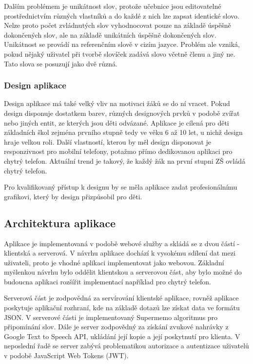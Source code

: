 \documentclass[a4paper,11pt,titlepage,fleqn]{article}
\begin{document}
            Dalším problémem je unikátnost slov, protože učebnice jsou editovatelné prostřednictvím různých vlastníků a do každé z nich lze zapsat identické slovo. Nelze proto počet zvládnutých slov vyhodnocovat pouze na základě úspěšně dokončených slov, ale na základě unikátních úspěšně dokončených slov. Unikátnost se provádí na referenčním slově v cizím jazyce. Problém ale vzniká, pokud nějaký uživatel při tvorbě slovíček zadává slovo včetně členu a jiný ne. Tato slova se posuzují jako dvě různá.

        \subsubsection{Design aplikace}
            Design aplikace má také velký vliv na motivaci žáků se do ní vracet. Pokud design disponuje dostatkem barev, různých designových prvků v podobě zvířat nebo jiných entit, ze kterých jsou děti odvázané. Aplikace je cílená pro děti základních škol zejména prvního stupně tedy ve věku 6 až 10 let, u nichž design hraje velkou roli. Další vlastností, kterou by měl design disponovat je responzivnost pro mobilní telefony, potažmo přímo dedikovanou aplikaci pro chytrý telefon. Aktuální trend je takový, že každý žák na první stupni ZŠ ovládá chytrý telefon.

            Pro kvalifikovaný přístup k designu by se měla aplikace zadat profesionálnímu grafikovi, který by design přizpůsobil pro děti.

    \subsection{Architektura aplikace}
        Aplikace je implementovaná v podobě webové služby a skládá se z dvou částí - klientská a serverová. V návrhu aplikace dochází k vysokému sdílení dat mezi uživateli, proto je vhodné aplikaci implementovat jako webovou. Základní myšlenkou návrhu bylo oddělit klientskou a serverovou část, aby bylo možné do budoucna aplikaci rozšířit implementací například pro chytrý telefon.

        Serverová část je zodpovědná za servírování klientské aplikace, rovněž aplikace poskytuje aplikační rozhraní, kde na základě dotazů lze získat data ve formátu JSON. V serverové části je implementovaný Supermemo algoritmus pro připomínání slov. Dále je server zodpovědný za získání zvukové nahrávky z Google Text to Speech API, ukládání její kopie a její poskytnutí pro klienta. V neposlední řadě se server zabývá problematikou autorizace a autentizace uživatelů v podobě JavaScript Web Tokens (JWT). 
\end{document}
